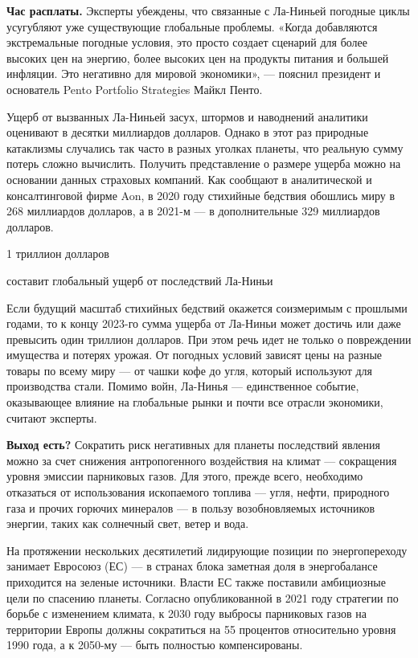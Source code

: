 \textbf{Час расплаты.} Эксперты убеждены, что связанные с Ла-Ниньей погодные циклы усугубляют уже существующие глобальные проблемы. «Когда добавляются экстремальные погодные условия, это просто создает сценарий для более высоких цен на энергию, более высоких цен на продукты питания и большей инфляции. Это негативно для мировой экономики», — пояснил президент и основатель Pento Portfolio Strategies Майкл Пенто.

Ущерб от вызванных Ла-Ниньей засух, штормов и наводнений аналитики оценивают в десятки миллиардов долларов. Однако в этот раз природные катаклизмы случались так часто в разных уголках планеты, что реальную сумму потерь сложно вычислить. Получить представление о размере ущерба можно на основании данных страховых компаний. Как сообщают в аналитической и консалтинговой фирме Aon, в 2020 году стихийные бедствия обошлись миру в 268 миллиардов долларов, а в 2021-м — в дополнительные 329 миллиардов долларов.

\begin{framed}
    \begin{center}
        {\Huge
            1 триллион долларов
        }

        {\Large
            составит глобальный ущерб от последствий Ла-Ниньи
        }
    \end{center}
\end{framed}

Если будущий масштаб стихийных бедствий окажется соизмеримым с прошлыми годами, то к концу 2023-го сумма ущерба от Ла-Ниньи может достичь или даже превысить один триллион долларов. При этом речь идет не только о повреждении имущества и потерях урожая. От погодных условий зависят цены на разные товары по всему миру — от чашки кофе до угля, который используют для производства стали. Помимо войн, Ла-Нинья — единственное событие, оказывающее влияние на глобальные рынки и почти все отрасли экономики, считают эксперты.

\textbf{Выход есть?} Сократить риск негативных для планеты последствий явления можно за счет снижения антропогенного воздействия на климат — сокращения уровня эмиссии парниковых газов. Для этого, прежде всего, необходимо отказаться от использования ископаемого топлива — угля, нефти, природного газа и прочих горючих минералов — в пользу возобновляемых источников энергии, таких как солнечный свет, ветер и вода.

На протяжении нескольких десятилетий лидирующие позиции по энергопереходу занимает Евросоюз (ЕС) — в странах блока заметная доля в энергобалансе приходится на зеленые источники. Власти ЕС также поставили амбициозные цели по спасению планеты. Согласно опубликованной в 2021 году стратегии по борьбе с изменением климата, к 2030 году выбросы парниковых газов на территории Европы должны сократиться на 55 процентов относительно уровня 1990 года, а к 2050-му — быть полностью компенсированы.

